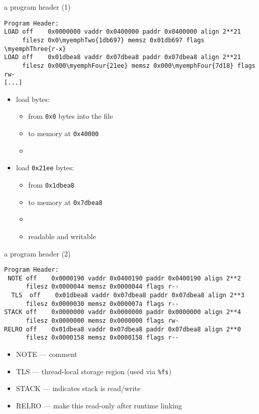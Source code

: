 \begin{frame}[fragile,label=elfExOver2]{a program header (1)}
\begin{Verbatim}[commandchars=\\\{\},fontsize=\fontsize{9}{10}\selectfont]
Program Header:
LOAD off    0x0000000 vaddr 0x0400000 paddr 0x0400000 align 2**21
     filesz 0x0\myemphTwo{1db697} memsz 0x01db697 flags \myemphThree{r-x}
LOAD off    0x01dbea8 vaddr 0x07dbea8 paddr 0x07dbea8 align 2**21
     filesz 0x000\myemphFour{21ee} memsz 0x000\myemphFour{7d18} flags rw-
[...]
\end{Verbatim}
\begin{itemize}
\item load {\tt {}} bytes:
        \begin{itemize}
        \item from {\tt 0x0} bytes into the file 
        \item to memory at {\tt 0x40000} \\
        \item {}
        \end{itemize}
\item load {\tt 0x21ee} bytes:
        \begin{itemize}
        \item from {\tt 0x1dbea8} 
        \item to memory at {\tt 0x7dbea8} 
        \item {}
        \item readable and writable
        \end{itemize}
\end{itemize}
\end{frame}

\begin{frame}[fragile,label=elfExOver3]{a program header (2)}
\begin{Verbatim}[commandchars=\\\{\},fontsize=\fontsize{9}{10}\selectfont]
Program Header:
 NOTE off    0x0000190 vaddr 0x0400190 paddr 0x0400190 align 2**2
      filesz 0x0000044 memsz 0x0000044 flags r--
  TLS  off    0x01dbea8 vaddr 0x07dbea8 paddr 0x07dbea8 align 2**3
      filesz 0x0000030 memsz 0x000007a flags r--
STACK off    0x0000000 vaddr 0x0000000 paddr 0x0000000 align 2**4
      filesz 0x0000000 memsz 0x0000000 flags rw-
RELRO off    0x01dbea8 vaddr 0x07dbea8 paddr 0x07dbea8 align 2**0
      filesz 0x0000158 memsz 0x0000158 flags r--
\end{Verbatim}
\begin{itemize}
\item NOTE --- comment
\item TLS --- thread-local storage region (used via {\tt \%fs})
\item STACK --- indicates stack is read/write
\item RELRO --- make this read-only after runtime linking
\end{itemize}
\end{frame}

